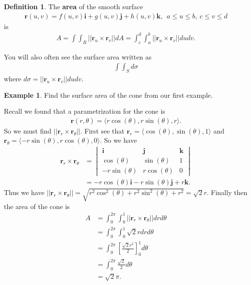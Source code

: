 \documentclass[12pt, letter]{article}
\theoremstyle{plain}
\numberwithin{theorem}{section}
\theoremstyle{definition}
\newtheorem{definition}[theorem]{Definition}
\newtheorem{example}[theorem]{Example}
\begin{document}
\bigskip

\begin{definition}
The \textbf{area} of the smooth surface
\begin{align*}
\bm{r}(u,v) = f(u,v)\bm{i}+g(u,v)\bm{j}+h(u,v)\bm{k}, \ \ a\leq u \leq b, \ c\leq v \leq d
\end{align*}
is
\begin{align*}
A = \int\int_R ||\bm{r}_u \times \bm{r}_v||dA = \int_c^d \int_a^b ||\bm{r}_u \times \bm{r}_v|| dudv.
\end{align*}
\end{definition}

\bigskip

\hrulefill

\bigskip

You will also often see the surface area written as
\begin{align*}
\int\int_S d\sigma
\end{align*}
where $d\sigma = ||\bm{r}_u\times \bm{r}_v||dudv$.

\bigskip

\hrulefill

\bigskip

\begin{example}
Find the surface area of the cone from our first example.

\bigskip

Recall we found that a parametrization for the cone is
\begin{align*}
\bm{r}(r,\theta) = \langle r\cos(\theta), r\sin(\theta), r \rangle.
\end{align*}
So we must find $||\bm{r}_r \times \bm{r}_\theta||$. First see that $\bm{r}_r = \langle \cos(\theta), \sin(\theta), 1 \rangle$ and $\bm{r}_\theta = \langle -r\sin(\theta), r\cos(\theta), 0 \rangle$. So we have
\begin{align*}
\bm{r}_r \times \bm{r}_\theta &= \begin{vmatrix} \bm{i} & \bm{j} & \bm{k} \\ \cos(\theta) & \sin(\theta) & 1 \\ -r\sin(\theta) & r\cos(\theta) & 0 \end{vmatrix}\\
&= -r\cos(\theta)\bm{i}-r\sin(\theta)\bm{j}+r\bm{k}.
\end{align*}
Thus we have $||\bm{r}_r \times \bm{r}_\theta|| = \sqrt{r^2\cos^2(\theta) + r^2\sin^2(\theta)+r^2} = \sqrt{2} r$. Finally then the area of the cone is
\begin{align*}
A &= \int_0^{2\pi}\int_0^1 ||\bm{r}_r\times \bm{r}_\theta|| drd\theta\\
&= \int_0^{2\pi}\int_0^1 \sqrt{2}r drd\theta\\
&= \int_0^{2\pi} \left[\frac{\sqrt{2}r^2}{2}\right]_0^1 d\theta\\
&=\int_0^{2\pi} \frac{\sqrt{2}}{2} d\theta\\
&= \sqrt{2} \pi.
\end{align*}
\end{example}
\end{document}
